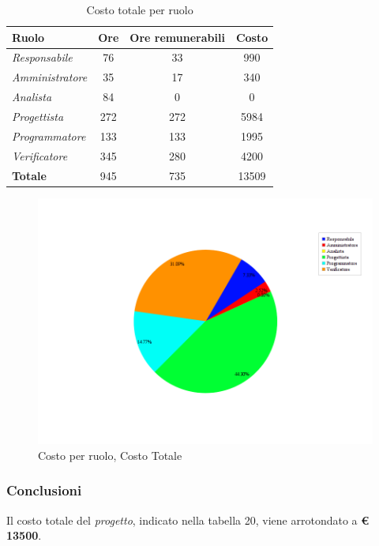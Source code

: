 \begin{table}[H]
	\begin{center}
		\begin{tabular}{|l|c|c|c|}
			\hline
			\textbf{Ruolo}	& \textbf{Ore} &	\textbf{Ore remunerabili}	 &\textbf{Costo} \\
			\hline
			\textit{Responsabile}	&	76	&	33	&	990	\\
			\hline
			\textit{Amministratore}	&	35	&	17	&	340	\\
			\hline
			\textit{Analista}	&	84	&	0	&	0	\\
			\hline
			\textit{Progettista}		&	272	&	272	&	5984	\\
			\hline
			\textit{Programmatore}	&	133	&	133	&	1995	\\
			\hline
			\textit{Verificatore}	&	345	&	280	&	4200	\\
			\hline
			\textbf{Totale}	&	945	&	735	&	13509	\\
			\hline
		\end{tabular}
	\end{center}
	\caption{Costo totale per ruolo}
\end{table}

\begin{figure}[H]
	\centering
	\includegraphics[scale=0.4]{immagini/Grafi/CostoTot}
	\caption{Costo per ruolo, Costo Totale}
\end{figure}

\subsubsection{Conclusioni}
Il costo totale del \textit{progetto}, indicato nella tabella 20, viene arrotondato a \textbf{€ 13500}.\\

